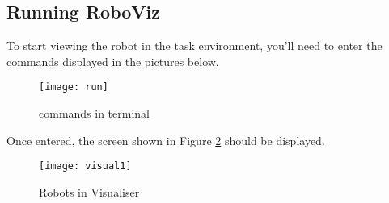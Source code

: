 \subsection{Running RoboViz}
\label{s:runningroboviz}

To start viewing the robot in the task environment, you'll need to enter the
commands displayed in the pictures below.
\begin{figure}[htpb]
    \centering
    \texttt{[image: run]}
    \caption{commands in terminal }
    \label{fig:commands-in-terminal}
\end{figure}

Once entered, the screen shown in Figure \ref{fig:robots-in-visualiser} should
be displayed.
\begin{figure}[htpb]
    \centering
    \texttt{[image: visual1]}
    \caption{Robots in Visualiser}
    \label{fig:robots-in-visualiser}
\end{figure}

